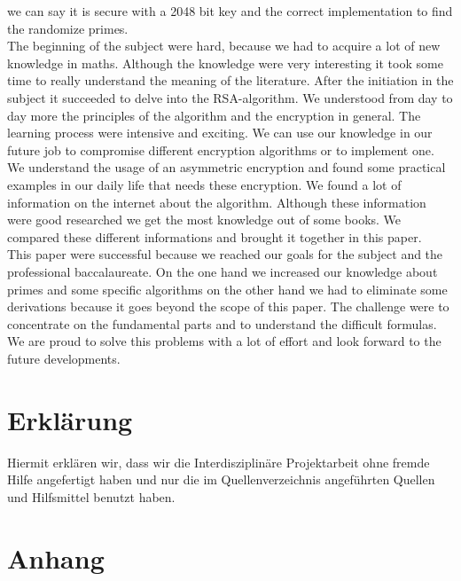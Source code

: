 we can say it is secure with a 2048 bit key and the correct implementation to find the randomize primes. \\
The beginning of the subject were hard, because we had to acquire a lot of new knowledge in maths. Although the knowledge were very interesting it took some time to really understand the meaning of the literature. After the initiation in the subject it succeeded to delve into the RSA-algorithm. %
We understood from day to day more the principles of the algorithm and the encryption in general. The learning process were intensive and exciting. We can use our knowledge in our future job to compromise different encryption algorithms or to implement one. We understand the usage of an asymmetric encryption and found some practical examples in our daily life that needs these encryption.  
We found a lot of information on the internet about the algorithm. Although these information were good researched we get the most knowledge out of some books. We compared these different informations and brought it together in this paper.\\
This paper were successful because we reached our goals for the subject and the professional baccalaureate. On the one hand we increased our knowledge about primes and some specific algorithms on the other hand we had to eliminate some derivations  %
because it goes beyond the scope of this paper. The challenge were to concentrate on the fundamental parts and to understand the difficult formulas. We are proud to solve this problems with a lot of effort and look forward to the future developments. 
\newpage
\section{Erklärung}
Hiermit erklären wir, dass wir die Interdisziplinäre Projektarbeit ohne fremde Hilfe angefertigt haben und nur die im Quellenverzeichnis angeführten Quellen und Hilfsmittel benutzt haben.
\newpage
\section{Anhang}
\listoffigures
%

